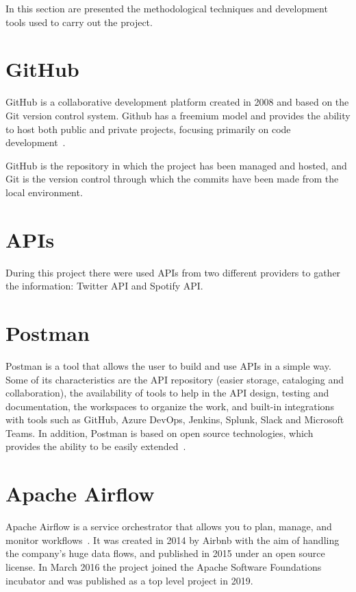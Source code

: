 
\nonzeroparskip In this section are presented the methodological techniques and development tools used to carry out the project.

\section{GitHub}

\nonzeroparskip GitHub is a collaborative development platform created in 2008 and based on the Git version control system. Github has a freemium model and provides the ability to host both public and private projects, focusing primarily on code development~\cite{wikipedia_github}.

\nonzeroparskip GitHub is the repository in which the project has been managed and hosted, and Git is the version control through which the commits have been made from the local environment.

\section{APIs}

\nonzeroparskip During this project there were used APIs from two different providers to gather the information: Twitter API and Spotify API.

\section{Postman}

\nonzeroparskip Postman is a tool that allows the user to build and use APIs in a simple way. Some of its characteristics are the API repository (easier storage, cataloging and collaboration), the availability of tools to help in the API design, testing and documentation, the workspaces to organize the work, and built-in integrations with tools such as GitHub, Azure DevOps, Jenkins, Splunk, Slack and Microsoft Teams. In addition, Postman is based on open source technologies, which provides the ability to be easily extended~\cite{postman}.

\section{Apache Airflow}

\nonzeroparskip Apache Airflow is a service orchestrator that allows you to plan, manage, and monitor workflows~\cite{airflow}. It was created in 2014 by Airbnb with the aim of handling the company's huge data flows, and published in 2015 under an open source license. In March 2016 the project joined the Apache Software Foundations incubator and was published as a top level project in 2019.

